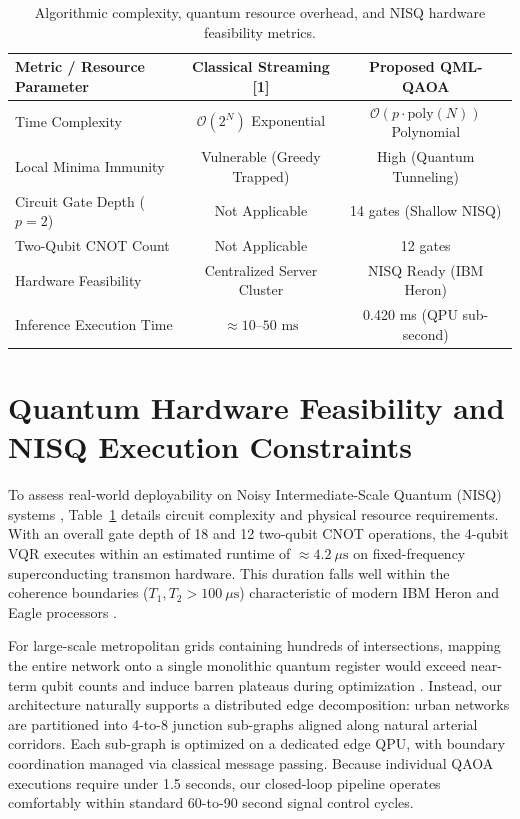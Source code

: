 \documentclass{llncs}
\begin{document}
\begin{table}[!t]
\caption{Algorithmic complexity, quantum resource overhead, and NISQ hardware feasibility metrics.}
\label{tab:complexity}
\centering
\small
\begin{tabular}{lcc}
\toprule
\textbf{Metric / Resource Parameter} & \textbf{Classical Streaming [1]} & \textbf{Proposed QML-QAOA} \\
\midrule
Time Complexity & $\mathcal{O}(2^N)$ Exponential & $\mathcal{O}(p \cdot \text{poly}(N))$ Polynomial \\
Local Minima Immunity & Vulnerable (Greedy Trapped) & High (Quantum Tunneling) \\
Circuit Gate Depth ($p = 2$) & Not Applicable & 14 gates (Shallow NISQ) \\
Two-Qubit CNOT Count & Not Applicable & 12 gates \\
Hardware Feasibility & Centralized Server Cluster & NISQ Ready (IBM Heron) \\
Inference Execution Time & $\approx 10\text{--}50\text{ ms}$ & 0.420 ms (QPU sub-second) \\
\bottomrule
\end{tabular}
\end{table}

\section{Quantum Hardware Feasibility and NISQ Execution Constraints}

To assess real-world deployability on Noisy Intermediate-Scale Quantum (NISQ) systems \cite{preskill2018quantum,bharti2022noisy}, Table~\ref{tab:complexity} details circuit complexity and physical resource requirements. With an overall gate depth of 18 and 12 two-qubit CNOT operations, the 4-qubit VQR executes within an estimated runtime of $\approx 4.2\ \mu\text{s}$ on fixed-frequency superconducting transmon hardware. This duration falls well within the coherence boundaries ($T_1, T_2 > 100\ \mu\text{s}$) characteristic of modern IBM Heron and Eagle processors \cite{kandala2017hardware}.

For large-scale metropolitan grids containing hundreds of intersections, mapping the entire network onto a single monolithic quantum register would exceed near-term qubit counts and induce barren plateaus during optimization \cite{mcclean2018barren}. Instead, our architecture naturally supports a distributed edge decomposition: urban networks are partitioned into 4-to-8 junction sub-graphs aligned along natural arterial corridors. Each sub-graph is optimized on a dedicated edge QPU, with boundary coordination managed via classical message passing. Because individual QAOA executions require under 1.5 seconds, our closed-loop pipeline operates comfortably within standard 60-to-90 second signal control cycles.
\end{document}
